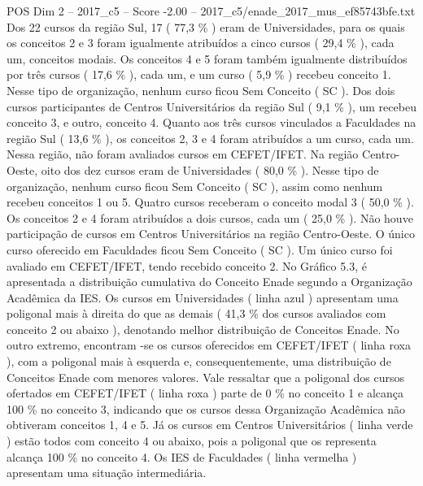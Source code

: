 \begin{textsample}{POS Dim 2 – 2017\_c5 – Score -2.00 – 2017\_c5/enade\_2017\_mus\_ef85743bfe.txt}
Dos 22 cursos da região Sul, 17 ( 77,3 \% ) eram de Universidades, para os quais os conceitos 2 e 3 foram igualmente atribuídos a cinco cursos ( 29,4 \% ), cada um, conceitos modais.
Os conceitos 4 e 5 foram também igualmente distribuídos por três cursos ( 17,6 \% ), cada um, e um curso ( 5,9 \% ) recebeu conceito 1.
Nesse tipo de organização, nenhum curso ficou Sem Conceito ( SC ).
Dos dois cursos participantes de Centros Universitários da região Sul ( 9,1 \% ), um recebeu conceito 3, e outro, conceito 4.
Quanto aos três cursos vinculados a Faculdades na região Sul ( 13,6 \% ), os conceitos 2, 3 e 4 foram atribuídos a um curso, cada um.
Nessa região, não foram avaliados cursos em CEFET/IFET.
Na região Centro-Oeste, oito dos dez cursos eram de Universidades ( 80,0 \% ).
Nesse tipo de organização, nenhum curso ficou Sem Conceito ( SC ), assim como nenhum recebeu conceitos 1 ou 5.
Quatro cursos receberam o conceito modal 3 ( 50,0 \% ).
Os conceitos 2 e 4 foram atribuídos a dois cursos, cada um ( 25,0 \% ).
Não houve participação de cursos em Centros Universitários na região Centro-Oeste.
O único curso oferecido em Faculdades ficou Sem Conceito ( SC ).
Um único curso foi avaliado em CEFET/IFET, tendo recebido conceito 2.
No Gráfico 5.3, é apresentada a distribuição cumulativa do Conceito Enade segundo a Organização Acadêmica da IES.
Os cursos em Universidades ( linha azul ) apresentam uma poligonal mais à direita do que as demais ( 41,3 \% dos cursos avaliados com conceito 2 ou abaixo ), denotando melhor distribuição de Conceitos Enade.
No outro extremo, encontram -se os cursos oferecidos em CEFET/IFET ( linha roxa ), com a poligonal mais à esquerda e, consequentemente, uma distribuição de Conceitos Enade com menores valores.
Vale ressaltar que a poligonal dos cursos ofertados em CEFET/IFET ( linha roxa ) parte de 0 \% no conceito 1 e alcança 100 \% no conceito 3, indicando que os cursos dessa Organização Acadêmica não obtiveram conceitos 1, 4 e 5.
Já os cursos em Centros Universitários ( linha verde ) estão todos com conceito 4 ou abaixo, pois a poligonal que os representa alcança 100 \% no conceito 4.
Os IES de Faculdades ( linha vermelha ) apresentam uma situação intermediária.

\end{textsample}
